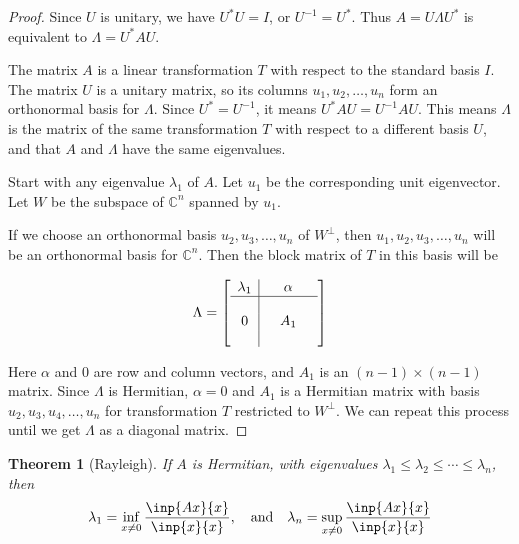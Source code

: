 \documentclass[twoside]{article}
\newcommand*\adj[1]{#1^*}
\theoremstyle{plain}
\newtheorem{theorem}{Theorem}
\theoremstyle{definition}
\theoremstyle{remark}
\begin{document}
\begin{proof} 

Since \(U\) is unitary, we have \(\adj{U} U = I\), or \(U^{-1} = \adj{U}\). Thus  \(A = U \Lambda \adj{U}\) is equivalent to \(\Lambda = \adj{U} A U\).


The matrix \(A\) is a linear transformation \(T\) with respect to the standard basis \(I\). The matrix \(U\) is a unitary matrix, so its columns \(u_1, u_2, \ldots , u_n\) form an orthonormal basis for \(\Lambda\). Since \(\adj{U} = U^{-1}\), it means \(\adj{U} A U = U^{-1}AU\). This means \(\Lambda\) is the matrix of the same transformation \(T\) with respect to a different basis \(U\), and that \(A\) and \(\Lambda\) have the same eigenvalues.

Start with any eigenvalue \(\lambda_1\) of \(A\). Let \(u_1\) be the corresponding unit eigenvector. Let \(W\) be the subspace of \(\mathbb{C}^n\) spanned by \(u_1\).

If we choose an orthonormal basis \(u_2, u_3, \ldots , u_n\) of \(W^\perp\), then \(u_1, u_2, u_3, \ldots , u_n\) will be an orthonormal basis for \(\mathbb{C}^n\).  Then the block matrix of \(T\) in this basis will be 

\[\Lambda = \left[\begin{array}{c|ccc}
 \lambda_1 & &\alpha& \\ 
\hline \\
0 & & A_1& \\ \\ \end{array} \right]\]

Here \(\alpha\) and \(0\) are row and column vectors, and \(A_1\) is an \((n-1) \times (n-1)\) matrix. 
Since \(\Lambda\) is Hermitian, \(\alpha = 0\) and \(A_1\) is a Hermitian matrix with basis \(u_2, u_3, u_4 , \ldots , u_n\) for transformation \(T\) restricted to \(W^\perp\). We can repeat this process until we get \(\Lambda\) as a diagonal matrix. 
\end{proof}

\begin{theorem}[Rayleigh] If \(A\) is Hermitian, with eigenvalues \(\lambda_1 \le \lambda_2 \le \cdots \le \lambda_n\), then 
\[\lambda_1 = \inf _{x \ne 0} \frac{\inp{Ax}{x}}{\inp{x}{x}}, \quad \text{and} \quad  \lambda_n = \sup_{x \ne 0} \frac{\inp{Ax}{x}}{\inp{x}{x}}\] \end{theorem}
\end{document}
